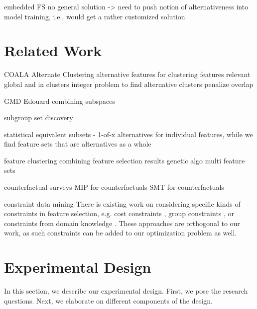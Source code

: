 \documentclass{article}
\theoremstyle{definition}
\begin{document}
embedded FS
no general solution -> need to push notion of alternativeness into model training, i.e., would get a rather customized solution

\section{Related Work}
\label{sec:related-work}

COALA \cite{bae2006coala}
Alternate Clustering \cite{bailey2014alternative}
alternative features for clustering \cite{tao2012novel}
features relevant global and in clusters \cite{guan2011unified}
integer problem to find alternative clusters \cite{bae2010clustering}
penalize overlap \cite{mueller2009relevant}

GMD \cite{trittenbach2019dimension}
Edouard \cite{fouche2021efficient}
combining subspaces \cite{nguyen20134s}

subgroup set discovery \cite{leeuwen2012diverse}

statistical equivalent subsets \cite{lagani2017feature, borboudakis2021extending, tsamardinos2003towards, dougherty2006number} - 1-of-x alternatives for individual features, while we find feature sets that are alternatives as a whole

feature clustering \cite{mueller2021feature}
combining feature selection results \cite{woznica2012model}
genetic algo multi feature sets \cite{siddiqi2020genetic}

counterfactual surveys \cite{verma2020counterfactual, stepin2021survey}
MIP for counterfactuals \cite{mohammadi2021scaling}
SMT for counterfactuals \cite{karimi2020model}

constraint data mining \cite{grossi2017survey}
There is existing work on considering specific kinds of constraints in feature selection, e.g. cost constraints \cite{paclik2002feature}, group constraints \cite{yuan2006model}, or constraints from domain knowledge \cite{groves2015toward}.
These approaches are orthogonal to our work, as such constraints can be added to our optimization problem as well.

\section{Experimental Design}
\label{sec:experimental-design}

In this section, we describe our experimental design.
First, we pose the research questions.
Next, we elaborate on different components of the design.
\end{document}
